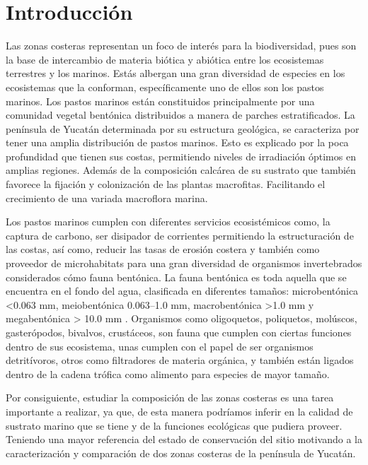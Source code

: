 \documentclass[
  authoryear,
  preprint,
  3p,
  twocolumn]{elsarticle}
\begin{document}
\hypertarget{introducciuxf3n}{%
\section{Introducción}\label{introducciuxf3n}}

Las zonas costeras representan un foco de interés para la biodiversidad,
pues son la base de intercambio de materia biótica y abiótica entre los
ecosistemas terrestres y los marinos. Estás albergan una gran diversidad
de especies en los ecosistemas que la conforman, específicamente uno de
ellos son los pastos marinos. Los pastos marinos están constituidos
principalmente por una comunidad vegetal bentónica
\citep{herrera2019pastos} distribuidos a manera de parches
estratificados. La península de Yucatán determinada por su estructura
geológica, se caracteriza por tener una amplia distribución de pastos
marinos. Esto es explicado por la poca profundidad que tienen sus
costas, permitiendo niveles de irradiación óptimos en amplias regiones.
Además de la composición calcárea de su sustrato que también favorece la
fijación y colonización de las plantas
macrofitas\citep{sanchez2007analisis}. Facilitando el crecimiento de una
variada macroflora marina.

Los pastos marinos cumplen con diferentes servicios ecosistémicos como,
la captura de carbono, ser disipador de corrientes permitiendo la
estructuración de las costas, así como, reducir las tasas de erosión
costera \citep{herrera2019pastos} y también como proveedor de
microhabitats para una gran diversidad de organismos invertebrados
considerados cómo fauna bentónica. La fauna bentónica es toda aquella
que se encuentra en el fondo del agua, clasificada en diferentes
tamaños: microbentónica \textless0.063 mm, meiobentónica 0.063--1.0 mm,
macrobentónica \textgreater1.0 mm y megabentónica \textgreater{} 10.0 mm
\citep{tagliapietra2010benthic}. Organismos como oligoquetos,
poliquetos, molúscos, gasterópodos, bivalvos, crustáceos, son fauna que
cumplen con ciertas funciones dentro de sus ecosistema, unas cumplen con
el papel de ser organismos detritívoros, otros como filtradores de
materia orgánica, y también están ligados dentro de la cadena trófica
como alimento para especies de mayor
tamaño\citep{tagliapietra2010benthic}.

Por consiguiente, estudiar la composición de las zonas costeras es una
tarea importante a realizar, ya que, de esta manera podríamos inferir en
la calidad de sustrato marino que se tiene y de la funciones ecológicas
que pudiera proveer. Teniendo una mayor referencia del estado de
conservación del sitio motivando a la caracterización y comparación de
dos zonas costeras de la península de Yucatán.
\end{document}
